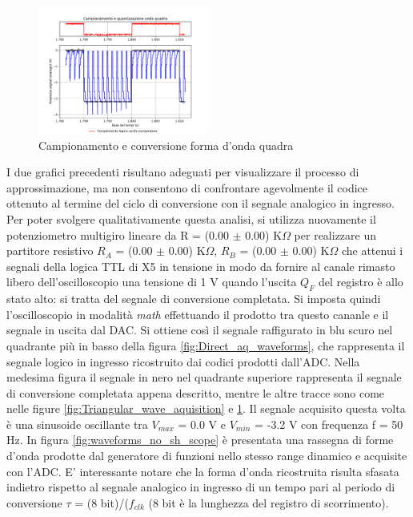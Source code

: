 \documentclass[journal]{IEEEtran}
\begin{document}
\begin{figure}[H]%
\begin{center}
\includegraphics[trim = {0 25 0 0},clip, width=0.50\textwidth]{analysis/output/square_wave_aq.pdf}
\caption{Campionamento e conversione forma d'onda quadra}
\label{fig:Square_wave_aquisition}
\end{center}
\end{figure}

I due grafici precedenti risultano adeguati per visualizzare il processo di approssimazione, ma non consentono di confrontare agevolmente il codice ottenuto al termine del ciclo di conversione con il segnale analogico in ingresso. Per poter svolgere qualitativamente questa analisi, si utilizza nuovamente il potenziometro multigiro lineare da R = (0.00 $\pm$ 0.00) K$\Omega$ per realizzare un partitore resistivo $R_A$ = (0.00 $\pm$ 0.00) K$\Omega$, $R_B$ = (0.00 $\pm$ 0.00) K$\Omega$ che attenui i segnali della logica TTL di X5 in tensione in modo da fornire al canale rimasto libero dell'oscilloscopio una tensione di 1 V quando l'uscita $Q_F$ del registro è allo stato alto: si tratta del segnale di conversione completata. Si imposta quindi l'oscilloscopio in modalità \textit{math} effettuando il prodotto tra questo cananle e il segnale in uscita dal DAC. Si ottiene così il segnale raffigurato in blu scuro nel quadrante più in basso della figura \ref{fig:Direct_aq_waveforms}, che rappresenta il segnale logico in ingresso ricostruito dai codici prodotti dall'ADC. Nella medesima figura il segnale in nero nel quadrante superiore rappresenta il segnale di conversione completata appena descritto, mentre le altre tracce sono come nelle figure \ref{fig:Triangular_wave_aquisition} e \ref{fig:Square_wave_aquisition}. Il segnale acquisito questa volta è una sinusoide oscillante tra $V_{max}$ = 0.0 V e $V_{min}$ = -3.2 V con frequenza f = 50 Hz. In figura \ref{fig:waveforms_no_sh_scope} è presentata una rassegna di forme d'onda prodotte dal generatore di funzioni nello stesso range dinamico e acquisite con l'ADC. E' interessante notare che la forma d'onda ricostruita risulta sfasata indietro rispetto al segnale analogico in ingresso di un tempo pari al periodo di conversione $\tau$ = (8 bit)/($f_{clk}$ (8 bit è la lunghezza del registro di scorrimento).
\end{document}
